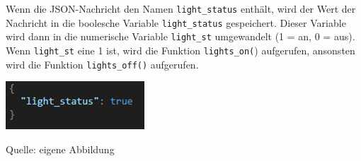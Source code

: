 \documentclass[ngerman,12pt,a4paper]{article}
\begin{document}
	Wenn die JSON-Nachricht den Namen \texttt{light\_status} enthält, wird der Wert der Nachricht in die boolesche Variable \texttt{light\_status}  gespeichert. Dieser Variable wird dann in die numerische Variable \texttt{light\_st} umgewandelt (1 = an, 0 = aus). Wenn \texttt{light\_st} eine 1 ist, wird die Funktion \texttt{lights\_on(}) aufgerufen, ansonsten wird die Funktion \texttt{lights\_off()} aufgerufen.
	\begin{center}
		\begin{minipage}[t]{0.35\textwidth}
			\includegraphics{Pictures/example-light}
			\label{fig:example-light}
			\vspace{-10pt}
			\begin{center}
				\par\small Quelle: eigene Abbildung 
			\end{center}
		\end{minipage} 
	\end{center}
\end{document}
